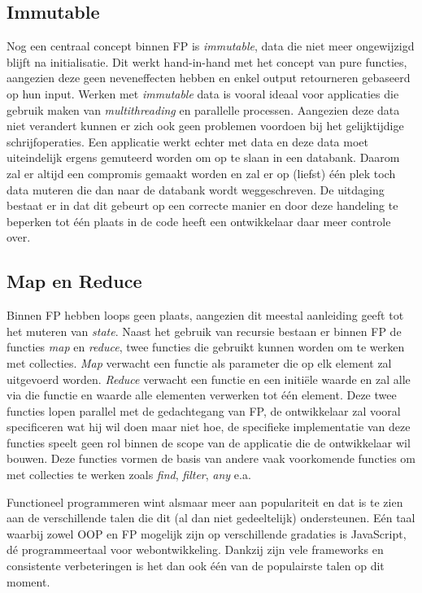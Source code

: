 \subsection{Immutable}
Nog een centraal concept binnen FP is \textit{immutable}, data die niet meer ongewijzigd blijft na initialisatie. Dit werkt hand-in-hand met het concept van pure functies, aangezien deze geen neveneffecten hebben en enkel output retourneren gebaseerd op hun input. Werken met \textit{immutable} data is vooral ideaal voor applicaties die gebruik maken van \textit{multithreading} en parallelle processen. Aangezien deze data niet verandert kunnen er zich ook geen problemen voordoen bij het gelijktijdige schrijfoperaties. Een applicatie werkt echter met data en deze data moet uiteindelijk ergens gemuteerd worden om op te slaan in een databank. Daarom zal er altijd een compromis gemaakt worden en zal er op (liefst) één plek toch data muteren die dan naar de databank wordt weggeschreven. De uitdaging bestaat er in dat dit gebeurt op een correcte manier en door deze handeling te beperken tot één plaats in de code heeft een ontwikkelaar daar meer controle over.

\subsection{Map en Reduce}
Binnen FP hebben loops geen plaats, aangezien dit meestal aanleiding geeft tot het muteren van \textit{state}. Naast het gebruik van recursie bestaan er binnen FP de functies \textit{map} en \textit{reduce}, twee functies die gebruikt kunnen worden om te werken met collecties. \textit{Map} verwacht een functie als parameter die op elk element zal uitgevoerd worden. \textit{Reduce} verwacht een functie en een initiële waarde en zal alle via die functie en waarde alle elementen verwerken tot één element. Deze twee functies lopen parallel met de gedachtegang van FP, de ontwikkelaar zal vooral specificeren wat hij wil doen maar niet hoe, de specifieke implementatie van deze functies speelt geen rol binnen de scope van de applicatie die de ontwikkelaar wil bouwen. Deze functies vormen de basis van andere vaak voorkomende functies om met collecties te werken zoals \textit{find}, \textit{filter}, \textit{any} e.a.

Functioneel programmeren wint alsmaar meer aan populariteit en dat is te zien aan de verschillende talen die dit (al dan niet gedeeltelijk) ondersteunen. Eén taal waarbij zowel OOP en FP mogelijk zijn op verschillende gradaties is JavaScript, dé programmeertaal voor webontwikkeling. Dankzij zijn vele frameworks en consistente verbeteringen is het dan ook één van de populairste talen op dit moment.

